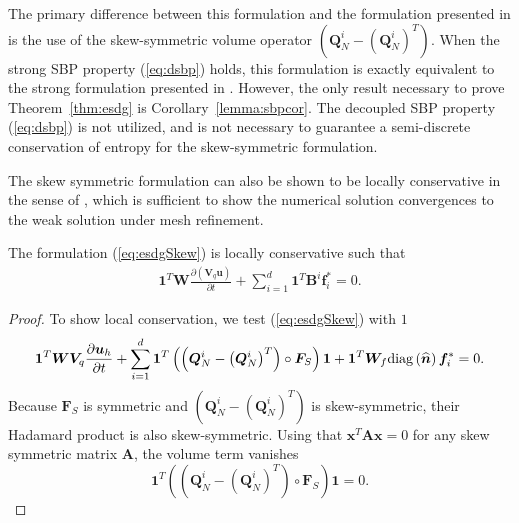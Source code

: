 \documentclass{svjour3}                     %
\renewcommand{\hat}{\widehat}
\newcommand{\diag}[1]{{\rm diag}\LRp{#1}}
\newcommand{\pd}[2]{\frac{\partial#1}{\partial#2}}
\newcommand{\LRp}[1]{\left( #1 \right)}
\begin{document}
\begin{remark}
The primary difference between this formulation and the formulation presented in \cite{chan2017discretely} is the use of the skew-symmetric volume operator $\LRp{\bm{Q}^i_N - \LRp{\bm{Q}^i_N}^T}$.  When the strong SBP property (\ref{eq:dsbp}) holds, this formulation is exactly equivalent to the strong formulation presented in \cite{chan2017discretely}.  However, the only result necessary to prove Theorem~\ref{thm:esdg} is Corollary~\ref{lemma:sbpcor}.  The decoupled SBP property (\ref{eq:dsbp}) is not utilized, and is not necessary to guarantee a semi-discrete conservation of entropy for the skew-symmetric formulation.  
\end{remark}


The skew symmetric formulation can also be shown to be locally conservative in the sense of \cite{shi2017local}, which is sufficient to show the numerical solution convergences to the weak solution under mesh refinement.  
\begin{theorem}
The formulation (\ref{eq:esdgSkew}) is locally conservative such that
\begin{align}
\bm{1}^T\bm{W}\pd{\LRp{\bm{V}_q\bm{u}}}{t} + \sum_{i=1}^d\bm{1}^T\bm{B}^i\bm{f}_i^* = 0. 
\end{align}
\end{theorem}
\begin{proof}
To show local conservation, we test (\ref{eq:esdgSkew}) with $1$
\begin{align}
\bm{1}^T\bm{W}\bm{V}_q\pd{\bm{u}_h}{t} + \sum_{i=1}^d
\bm{1}^T
\LRp{\LRp{\bm{Q}^i_N - \LRp{\bm{Q}^i_N}^T} \circ \bm{F}_S}\bm{1} + \bm{1}^T\bm{W}_f \diag{\hat{\bm{n}}}\bm{f}_i^* = 0. 
\end{align}
Because $\bm{F}_S$ is symmetric and $\LRp{\bm{Q}^i_N - \LRp{\bm{Q}^i_N}^T}$ is skew-symmetric, their Hadamard product is also skew-symmetric.  Using that $\bm{x}^T\bm{A}\bm{x} = 0$ for any skew symmetric matrix $\bm{A}$, the volume term vanishes
\[
\bm{1}^T\LRp{\LRp{\bm{Q}^i_N - \LRp{\bm{Q}^i_N}^T} \circ \bm{F}_S}\bm{1} = 0.
\]
\end{proof}
\end{document}
